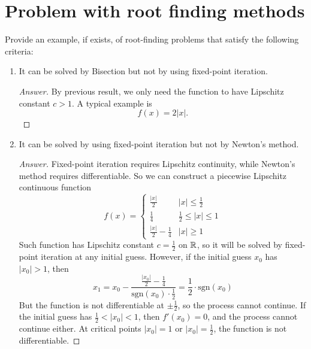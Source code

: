 


\section{Problem with root finding methods}
Provide an example, if exists, of root-finding problems that satisfy the following criteria:
\begin{enumerate}
	\item It can be solved by Bisection but not by using fixed-point iteration.
	\begin{proof}[Answer]
		By previous result, we only need the function to have Lipschitz constant \(c>1\).
		A typical example is
		\[ f(x)=2|x|. \]
	\end{proof}
	\item It can be solved by using fixed-point iteration but not by Newton's method.
	\begin{proof}[Answer]
		Fixed-point iteration requires Lipschitz continuity, while Newton's method requires differentiable.
		So we can construct a piecewise Lipschitz continuous function
		\[ f(x)=\begin{cases}
		\frac{\left| x\right| }{2} & |x|\leq \frac{1}{2} \\
		\frac{1}{4} &  \frac{1}{2}\leq |x| \leq 1 \\
		\frac{\left| x\right| }{2}-\frac{1}{4} & |x|\geq 1
		\end{cases} \]
		Such function has Lipschitz constant \(c=\frac{1}{2}\) on \(\mathbb{R}\), so it will be solved by fixed-point iteration at any initial guess.
		However, if the initial guess \(x_0\) has \(|x_0|>1\), then
		\[ x_1=x_0-\frac{\frac{|x_0|}{2}-\frac{1}{4}}{\text{sgn}{(x_0)}\cdot\frac{1}{2}}=\frac{1}{2}\cdot\text{sgn}{(x_0)} \]
		But the function is not differentiable at \(\pm\frac{1}{2}\), so the process cannot continue.
		If the initial guess has \(\frac{1}{2}<|x_0|<1\), then \(f'(x_0)=0\), and the process cannot continue either.
		At critical points \(|x_0|=1\) or \(|x_0|=\frac{1}{2}\), the function is not differentiable.
	\end{proof}
\end{enumerate}




